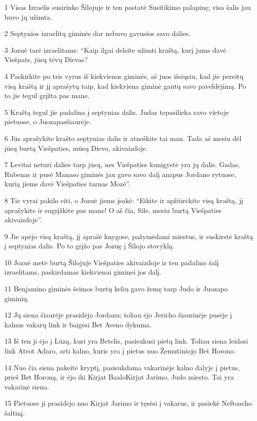 \par 1 Visas Izraelis susirinko Šilojuje ir ten pastatė Susitikimo palapinę; visa šalis jau buvo jų užimta. 
\par 2 Septynios izraelitų giminės dar nebuvo gavusios savo dalies. 
\par 3 Jozuė tarė izraelitams: “Kaip ilgai delsite užimti kraštą, kurį jums davė Viešpats, jūsų tėvų Dievas? 
\par 4 Paskirkite po tris vyrus iš kiekvienos giminės, aš juos išsiųsiu, kad jie pereitų visą kraštą ir jį aprašytų taip, kad kiekviena giminė gautų savo paveldėjimą. Po to jie tegul grįžta pas mane. 
\par 5 Kraštą tegul jie padalina į septynias dalis. Judas tepasilieka savo vietoje pietuose, o Juozapas­šiaurėje. 
\par 6 Jūs aprašykite krašto septynias dalis ir atneškite tai man. Tada aš mesiu dėl jūsų burtą Viešpaties, mūsų Dievo, akivaizdoje. 
\par 7 Levitai neturi dalies tarp jūsų, nes Viešpaties kunigystė yra jų dalis. Gadas, Rubenas ir pusė Manaso giminės jau gavo savo dalį anapus Jordano rytuose, kurią jiems davė Viešpaties tarnas Mozė”. 
\par 8 Tie vyrai pakilo eiti, o Jozuė jiems įsakė: “Eikite ir apžiūrėkite visą kraštą, jį aprašykite ir sugrįžkite pas mane! O aš čia, Sile, mesiu burtą Viešpaties akivaizdoje”. 
\par 9 Jie apėjo visą kraštą, jį aprašė knygose, pažymėdami miestus, ir suskirstė kraštą į septynias dalis. Po to grįžo pas Jozuę į Šilojo stovyklą. 
\par 10 Jozuė metė burtą Šilojuje Viešpaties akivaizdoje ir ten padalino šalį izraelitams, paskirdamas kiekvienai giminei jos dalį. 
\par 11 Benjamino giminės šeimos burtų keliu gavo žemę tarp Judo ir Juozapo giminių. 
\par 12 Jų siena šiaurėje prasidėjo Jordanu; toliau ėjo Jericho šiaurinėje pusėje į kalnus vakarų link ir baigėsi Bet Aveno dykuma. 
\par 13 Iš ten ji ėjo į Lūzą, kuri yra Betelis, pasisukusi pietų link. Toliau siena leidosi link Atrot Adaro, arti kalno, kuris yra į pietus nuo Žemutiniojo Bet Horono. 
\par 14 Nuo čia siena pakeitė kryptį, pasisukdama vakarinėje kalno dalyje į pietus, prieš Bet Horoną, ir ėjo iki Kirjat Baalo­Kirjat Jarimo, Judo miesto. Tai yra vakarinė siena. 
\par 15 Pietuose ji prasidėjo nuo Kirjat Jarimo ir tęsėsi į vakarus, ir pasiekė Neftoacho šaltinį. 
